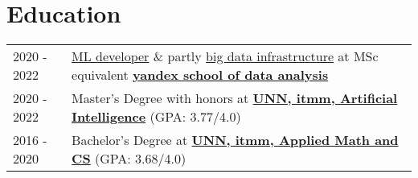 \documentclass[a4paper,12pt]{article}
\begin{document}
\section{Education}
\begin{tabularx}{\linewidth}{@{}l X@{}}	
2020 - 2022 & \href{https://academy.yandex.com/dataschool/course/machine-learning}{ML developer} \& partly \href{https://academy.yandex.com/dataschool/course/big-data-infrastructure}{big data infrastructure} at MSc equivalent \textbf{\href{https://academy.yandex.com/dataschool/}{yandex school of data analysis}} \\
2020 - 2022 & Master's Degree with honors at \textbf{\href{https://itmm.unn.ru/obrazovanie/magistratura/iskusstvennyj-intellekt}{UNN, itmm, Artificial Intelligence}} \hfill \normalsize (GPA: 3.77/4.0) \\
2016 - 2020 & Bachelor's Degree at \textbf{\href{https://itmm.unn.ru/courses/pmi}{UNN, itmm, Applied Math and CS}} \hfill (GPA: 3.68/4.0) \\

\end{tabularx}


\end{document}
